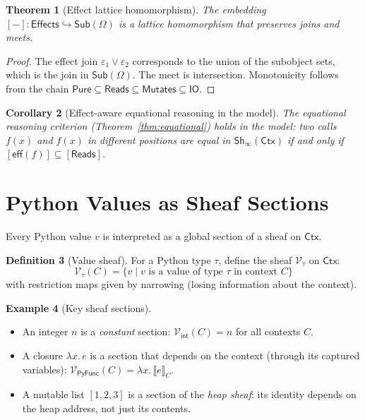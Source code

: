 \documentclass[11pt,a4paper]{report}
\theoremstyle{definition}
\newtheorem{definition}{Definition}[chapter]
\newtheorem{example}[definition]{Example}
\theoremstyle{plain}
\newtheorem{theorem}[definition]{Theorem}
\newtheorem{corollary}[definition]{Corollary}
\newcommand{\den}[1]{\llbracket #1 \rrbracket}
\newcommand{\PyFunc}{\mathsf{PyFunc}}
\newcommand{\Ctx}{\mathsf{Ctx}}
\newcommand{\Pure}{\mathsf{Pure}}
\newcommand{\Reads}{\mathsf{Reads}}
\newcommand{\Mutates}{\mathsf{Mutates}}
\newcommand{\IO}{\mathsf{IO}}
\newcommand{\Sh}{\mathsf{Sh}}
\begin{document}
\begin{theorem}[Effect lattice homomorphism]
The embedding $[-] : \mathsf{Effects} \hookrightarrow \mathsf{Sub}(\Omega)$
is a lattice homomorphism that preserves joins and meets.
\end{theorem}
\begin{proof}
The effect join $\varepsilon_1 \vee \varepsilon_2$ corresponds to the union
of the subobject sets, which is the join in $\mathsf{Sub}(\Omega)$.
The meet is intersection.  Monotonicity follows from the chain
$\Pure \subseteq \Reads \subseteq \Mutates \subseteq \IO$.
\end{proof}

\begin{corollary}[Effect-aware equational reasoning in the model]
The equational reasoning criterion (Theorem~\ref{thm:equational}) holds in the
model: two calls $f(x)$ and $f(x)$ in different positions are equal in
$\Sh_\infty(\Ctx)$ if and only if $[\mathsf{eff}(f)] \subseteq [\Reads]$.
\end{corollary}


\section{Python Values as Sheaf Sections}

Every Python value $v$ is interpreted as a global section of a sheaf on $\Ctx$.

\begin{definition}[Value sheaf]
For a Python type $\tau$, define the sheaf $\mathcal{V}_\tau$ on $\Ctx$:
\[
  \mathcal{V}_\tau(C) = \{v \mid v \text{ is a value of type } \tau \text{ in context } C\}
\]
with restriction maps given by narrowing (losing information about the context).
\end{definition}

\begin{example}[Key sheaf sections]
\begin{itemize}
  \item An integer $n$ is a \emph{constant} section: $\mathcal{V}_{\mathsf{int}}(C) = n$
    for all contexts $C$.
  \item A closure $\lambda x.\, e$ is a section that depends on the context
    (through its captured variables): $\mathcal{V}_{\PyFunc}(C) = \lambda x.\, \den{e}_{C}$.
  \item A mutable list $[1, 2, 3]$ is a section of the \emph{heap sheaf}: its
    identity depends on the heap address, not just its contents.
\end{itemize}
\end{example}
\end{document}
